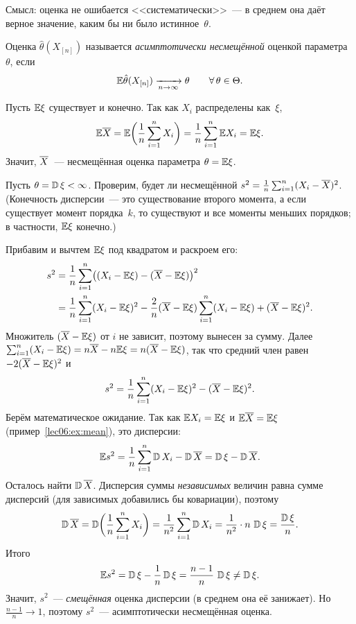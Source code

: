 Смысл: оценка не ошибается <<систематически>>~--- в среднем она даёт верное значение,
каким бы ни было истинное~$\theta$.

\begin{definition}
  Оценка $\hat\theta(X_{[n]})$ называется \emph{асимптотически несмещённой} оценкой
  параметра~$\theta$, если
  \[
    \mathbb{E} \hat\theta(X_{[n]}) \xrightarrow[n \to \infty]{} \theta \qquad \forall\, \theta \in \Theta.
  \]
\end{definition}

\begin{example}
  \label{lec06:ex:mean}
  Пусть $\mathbb{E}\xi$ существует и конечно. Так как $X_i$ распределены как~$\xi$,
  \[
    \mathbb{E}\overline{X} = \mathbb{E}\biggl(\frac1n \sum_{i=1}^n X_i\biggr) = \frac1n \sum_{i=1}^n \mathbb{E} X_i = \mathbb{E}\xi.
  \]
  Значит, $\overline{X}$~--- несмещённая оценка параметра $\theta = \mathbb{E}\xi$.
\end{example}

\begin{example}
  \label{lec06:ex:var}
  Пусть $\theta = \operatorname{\mathbb{D}}\xi < \infty$. Проверим, будет ли несмещённой
  $s^2 = \frac1n \sum_{i=1}^n (X_i - \overline{X})^2$. (Конечность дисперсии~--- это
  существование второго момента, а если существует момент порядка~$k$, то существуют
  и все моменты меньших порядков; в частности, $\mathbb{E}\xi$ конечно.)

  Прибавим и вычтем $\mathbb{E}\xi$ под квадратом и раскроем его:
  \begin{align*}
    s^2 &= \frac1n \sum_{i=1}^n \bigl((X_i - \mathbb{E}\xi) - (\overline{X} - \mathbb{E}\xi)\bigr)^2 \\
        &= \frac1n \sum_{i=1}^n (X_i - \mathbb{E}\xi)^2
           - \frac2n (\overline{X} - \mathbb{E}\xi) \sum_{i=1}^n (X_i - \mathbb{E}\xi)
           + (\overline{X} - \mathbb{E}\xi)^2.
  \end{align*}
  Множитель $(\overline{X} - \mathbb{E}\xi)$ от $i$ не зависит, поэтому вынесен за сумму. Далее
  $\sum_{i=1}^n (X_i - \mathbb{E}\xi) = n\overline{X} - n\mathbb{E}\xi = n(\overline{X} - \mathbb{E}\xi)$, так что средний член
  равен $-2(\overline{X} - \mathbb{E}\xi)^2$ и
  \[
    s^2 = \frac1n \sum_{i=1}^n (X_i - \mathbb{E}\xi)^2 - (\overline{X} - \mathbb{E}\xi)^2.
  \]
  Берём математическое ожидание. Так как $\mathbb{E} X_i = \mathbb{E}\xi$ и $\mathbb{E}\overline{X} = \mathbb{E}\xi$
  (пример~\ref{lec06:ex:mean}), это дисперсии:
  \[
    \mathbb{E} s^2 = \frac1n \sum_{i=1}^n \operatorname{\mathbb{D}} X_i - \operatorname{\mathbb{D}}\overline{X} = \operatorname{\mathbb{D}}\xi - \operatorname{\mathbb{D}}\overline{X}.
  \]
  Осталось найти $\operatorname{\mathbb{D}}\overline{X}$. Дисперсия суммы \emph{независимых} величин равна сумме
  дисперсий (для зависимых добавились бы ковариации), поэтому
  \[
    \operatorname{\mathbb{D}}\overline{X} = \operatorname{\mathbb{D}}\biggl(\frac1n \sum_{i=1}^n X_i\biggr) = \frac{1}{n^2} \sum_{i=1}^n \operatorname{\mathbb{D}} X_i
            = \frac{1}{n^2} \cdot n\,\operatorname{\mathbb{D}}\xi = \frac{\operatorname{\mathbb{D}}\xi}{n}.
  \]
  Итого
  \[
    \mathbb{E} s^2 = \operatorname{\mathbb{D}}\xi - \frac1n \operatorname{\mathbb{D}}\xi = \frac{n-1}{n}\, \operatorname{\mathbb{D}}\xi \ne \operatorname{\mathbb{D}}\xi.
  \]
  Значит, $s^2$~--- \emph{смещённая} оценка дисперсии (в среднем она её занижает).
  Но $\frac{n-1}{n} \to 1$, поэтому $s^2$~--- асимптотически несмещённая оценка.
\end{example}

